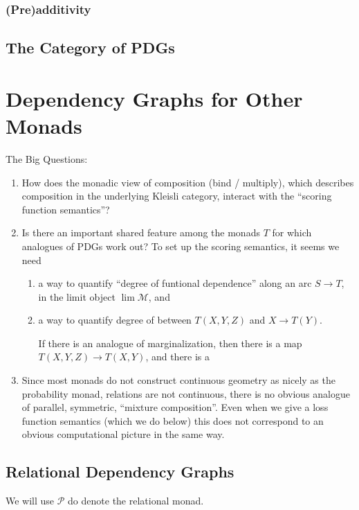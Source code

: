 \subsubsection{(Pre)additivity}

\subsection{The Category of PDGs}

        
\section{Dependency Graphs for Other Monads}

The Big Questions:
\begin{enumerate}
    \item How does the monadic view of composition (bind / multiply), which describes composition in the underlying Kleisli category, interact with the ``scoring function semantics''? 
    \item Is there an important shared feature among the monads $T$ for which analogues of PDGs work out?  To set up the scoring semantics, it seems we need
    \begin{enumerate}
        \item a way to quantify ``degree of funtional dependence'' along an arc $S \to T$, in the limit object $\lim \mathcal M$, and
        \item a way to quantify degree of between $T(X,Y,Z)$ and $X \to T(Y)$.
        
        If there is an analogue of marginalization, then there is a map $T(X,Y,Z) \to T(X,Y)$, and there is a 
    \end{enumerate}
    
    \item Since most monads do not construct continuous geometry as nicely as the probability monad, relations are not continuous, there is no obvious analogue of parallel, symmetric, ``mixture composition''. Even when we give a loss function semantics (which we do below) this does not correspond to an obvious computational picture in the same way. 
\end{enumerate}

\subsection{Relational Dependency Graphs}

We will use $\mathcal P$ do denote the relational monad. 


